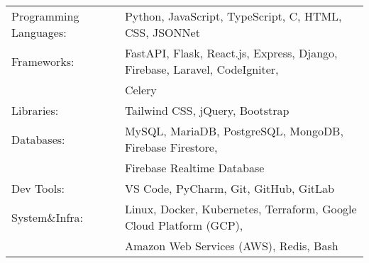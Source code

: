 \begin{tabular}{ l l }
	Programming Languages: & Python, JavaScript, TypeScript, C, HTML, CSS, JSONNet                         \\
	Frameworks:            & FastAPI, Flask, React.js, Express, Django, Firebase, Laravel, CodeIgniter,  \\ & Celery        \\
	Libraries:             & Tailwind CSS, jQuery, Bootstrap                                                          \\
	Databases:             & MySQL, MariaDB, PostgreSQL, MongoDB, Firebase Firestore, \\ & Firebase Realtime Database      \\
	Dev Tools:             & VS Code, PyCharm, Git, GitHub, GitLab                                                    \\
	System\&Infra:         & Linux, Docker, Kubernetes, Terraform, Google Cloud Platform (GCP), \\ & Amazon Web Services (AWS), Redis, Bash \\
\end{tabular}
\vspace{2mm}

